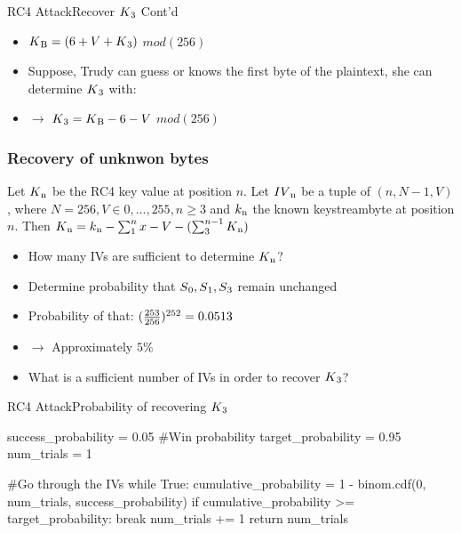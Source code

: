 \documentclass[
	aspectratio=169,	%
	onlytextwidth,		%
	t,					%
	]{beamer}
\begin{document}
\begin{frame}[fragile]{RC4 Attack}{Recover $K\textsubscript{3}$ Cont'd}

	\begin{itemize}
		\item $K\textsubscript{B} = (6 + V + K\textsubscript{3})$ $mod(256)$
		\item Suppose, Trudy can guess or knows the first byte of the plaintext, she can determine $K\textsubscript{3}$ with:
		\item $\rightarrow$ $K\textsubscript{3}  = K\textsubscript{B} - 6 - V$ $mod(256)$
	\end{itemize}
\end{frame}

\begin{frame} 
	\frametitle{Recovery of unknwon bytes} 
	\begin{theorem}
		Let $ K\textsubscript{n} $ be the RC4 key value at position $ n $. Let $ IV\textsubscript{n} $ be a tuple of $ (n, N-1, V) $,
		where $ N = 256, V \in {{0,\dots,255}}, n \geq 3 $ and $ k\textsubscript{n} $ the known keystreambyte at position $n$.
		Then $ K\textsubscript{n} = k\textsubscript{n} - \sum_{1}^{n}x - V - (\sum_{3}^{n-1}K\textsubscript{n}) $ 
	\end{theorem} 
	\begin{itemize}
		\item How many IVs are sufficient to determine $ K\textsubscript{n} $?
		\item Determine probability that $ S\textsubscript{0}, S\textsubscript{1}, S\textsubscript{3} $ remain unchanged
		\item Probability of that: $(\frac{253}{256})\textsuperscript{252} = 0.0513$
		\item $\rightarrow$ Approximately $5\%$
		\item What is a sufficient number of IVs in order to recover $K\textsubscript{3}$?
	\end{itemize}
\end{frame}

\begin{frame}[fragile]{RC4 Attack}{Probability of recovering $K\textsubscript{3}$}
	\begin{python}
		success_probability = 0.05
		#Win probability
		target_probability = 0.95
		num_trials = 1

		#Go through the IVs
		while True:
			cumulative_probability = 1 - binom.cdf(0, num_trials, success_probability)
			if cumulative_probability >= target_probability:
				break
			num_trials += 1
		return num_trials
	\end{python}
\end{frame}
\end{document}
